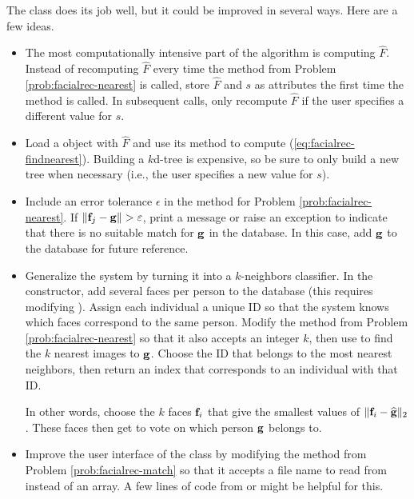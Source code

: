 The  class does its job well, but it could be improved in several ways.
Here are a few ideas.
\begin{itemize}
    \item The most computationally intensive part of the algorithm is computing $\widehat{F}$.
    Instead of recomputing $\widehat{F}$ every time the method from Problem \ref{prob:facialrec-nearest} is called, store $\widehat{F}$ and $s$ as attributes the first time the method is called.
    In subsequent calls, only recompute $\widehat{F}$ if the user specifies a different value for $s$.

    \item Load a  object with $\widehat{F}$ and use its  method to compute (\ref{eq:facialrec-findnearest}).
    Building a $k$d-tree is expensive, so be sure to only build a new tree when necessary (i.e., the user specifies a new value for $s$).

    \item Include an error tolerance $\epsilon$ in the method for Problem \ref{prob:facialrec-nearest}.
    If $\|\mathbf{f}_j - \mathbf{g}\| > \varepsilon$, print a message or raise an exception to indicate that there is no suitable match for $\mathbf{g}$ in the database.
    In this case, add $\mathbf{g}$ to the database for future reference.

    \item Generalize the system by turning it into a $k$-neighbors classifier.
    In the constructor, add several faces per person to the database (this requires modifying ).
    Assign each individual a unique ID so that the system knows which faces correspond to the same person.
    Modify the method from Problem \ref{prob:facialrec-nearest} so that it also accepts an integer $k$, then use  to find the $k$ nearest images to $\mathbf{g}$.
    Choose the ID that belongs to the most nearest neighbors, then return an index that corresponds to an individual with that ID.

    In other words, choose the $k$ faces $\mathbf{f}_i$ that give the smallest values of $\|\mathbf{f}_i - \widehat{\mathbf{g}}\|_2$.
    These faces then get to vote on which person $\mathbf{g}$ belongs to.

    \item Improve the user interface of the class by modifying the method from Problem \ref{prob:facialrec-match} so that it accepts a file name to read from instead of an array.
    A few lines of code from  or  might be helpful for this.
\end{itemize}

